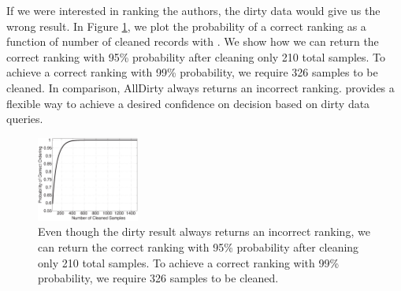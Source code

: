 If we were interested in ranking the authors, the dirty data would give us the wrong result. 
In Figure \ref{exp:ms-academic-ranking}, we plot the probability of a correct ranking as a function of number of cleaned records with \sampleclean.
We show how we can return the correct ranking with 95\% probability after cleaning only 210 total samples.
To achieve a correct ranking with 99\% probability, we require 326 samples to be cleaned.
In comparison, AllDirty always returns an incorrect ranking.
\sampleclean provides a flexible way to achieve a desired confidence on decision based on dirty data queries.

\begin{figure}
\includegraphics[width=0.3\textwidth]{figs/msacademic-paper-ranking.eps}
\caption{Even though the dirty result always returns an incorrect ranking, we can return the correct ranking with 95\% probability after cleaning only 210 total samples. To achieve a correct ranking with 99\% probability, we require 326 samples to be cleaned.\label{exp:ms-academic-ranking}}

\end{figure}


